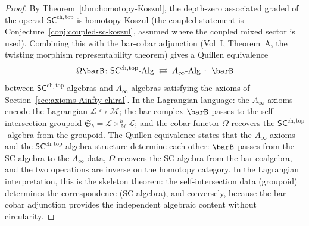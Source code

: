 \begin{proof}
By Theorem~\ref{thm:homotopy-Koszul}, the depth-zero associated
graded of the operad
$\mathsf{SC}^{\mathrm{ch,top}}$ is homotopy-Koszul (the coupled
statement is Conjecture~\ref{conj:coupled-sc-koszul}, assumed
where the coupled mixed sector is used). Combining this
with the bar-cobar adjunction (Vol~I, Theorem~A, the twisting morphism representability theorem) gives a Quillen
equivalence
\[
 \Omega\barB \colon
 \mathsf{SC}^{\mathrm{ch,top}}\text{-}\mathrm{Alg}
 \;\rightleftarrows\;
 A_\infty\text{-}\mathrm{Alg}
 \;\colon\; \barB
\]
between $\mathsf{SC}^{\mathrm{ch,top}}$-algebras and $A_\infty$
algebras satisfying the axioms of Section~\ref{sec:axioms-Ainfty-chiral}.
In the Lagrangian language: the $A_\infty$ axioms encode the
Lagrangian $\mathcal{L} \hookrightarrow \mathcal{M}$; the bar
complex $\barB$ passes to the self-intersection groupoid
$\mathfrak{S}_b = \mathcal{L}\times_{\mathcal{M}}^h\mathcal{L}$;
and the cobar functor $\Omega$ recovers the
$\mathsf{SC}^{\mathrm{ch,top}}$-algebra from the groupoid. The
Quillen equivalence states that the $A_\infty$ axioms and the
$\mathsf{SC}^{\mathrm{ch,top}}$-algebra structure determine each
other: $\barB$ passes from the SC-algebra to the $A_\infty$ data,
$\Omega$ recovers the SC-algebra from the bar coalgebra, and the
two operations are inverse on the homotopy category. In the
Lagrangian interpretation, this is the skeleton theorem: the
self-intersection data (groupoid) determines the correspondence
(SC-algebra), and conversely, because the bar-cobar adjunction
provides the independent algebraic content without circularity.
\end{proof}

